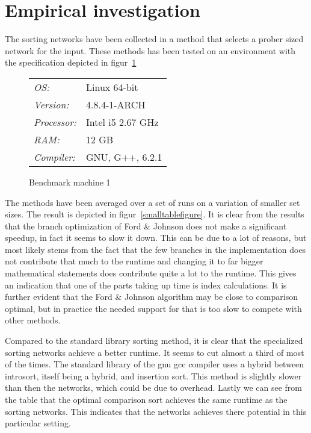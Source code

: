 \section{Empirical investigation}
The sorting networks have been collected in a method that selects a prober
sized network for the input. These methods has been tested on an environment
with the specification depicted in figur~\ref{fig:pc1}\\

\begin{figure}
    \centering
    \begin{tabular}{ll}
            \textit{OS:} & Linux 64-bit\\
            \textit{Version:} & 4.8.4-1-ARCH\\
            \textit{Processor:} & Intel i5 2.67 GHz\\
            \textit{RAM:} & 12 GB\\
            \textit{Compiler:} & GNU, G++, 6.2.1
    \end{tabular}
    \caption{Benchmark machine 1}
    \label{fig:pc1}
\end{figure}

The methods have been averaged over a set of runs on a variation of smaller set
sizes. The result is depicted in figur~\ref{smalltablefigure}. It is clear from
the results that the branch optimization of Ford \& Johnson does not make a
significant speedup, in fact it seems to slow it down. This can be due to a lot of reasons, but most likely stems
from the fact that the few branches in the implementation does not contribute
that much to the runtime and changing it to far bigger mathematical statements does contribute quite a lot to the runtime. This gives an indication that one of the parts taking up time is index calculations. It is further evident that the Ford \& Johnson algorithm may
be close to comparison optimal, but in practice the needed support for that is too slow to compete with other methods.

Compared to the standard library sorting method, it is clear that the
specialized sorting networks achieve a better runtime. It seems to cut almost a third of most of the times. The standard
library of the gnu gcc compiler uses a hybrid between introsort, itself being a
hybrid, and insertion sort\cite{gnustd}. This method is slightly slower than then the networks, which could be due to overhead. Lastly we can see from the table that the optimal comparison sort achieves the same runtime as the sorting networks. This indicates that the networks achieves there potential in this particular setting.

